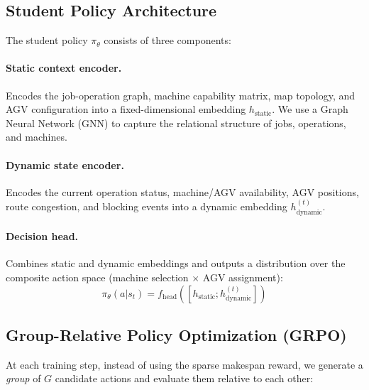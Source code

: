 \documentclass[11pt,a4paper]{article}
\begin{document}
\subsection{Student Policy Architecture}

The student policy $\pi_\theta$ consists of three components:

\paragraph{Static context encoder.}
Encodes the job-operation graph, machine capability matrix, map topology, and AGV configuration into a fixed-dimensional embedding $h_{\text{static}}$. We use a Graph Neural Network (GNN) to capture the relational structure of jobs, operations, and machines.

\paragraph{Dynamic state encoder.}
Encodes the current operation status, machine/AGV availability, AGV positions, route congestion, and blocking events into a dynamic embedding $h_{\text{dynamic}}^{(t)}$.

\paragraph{Decision head.}
Combines static and dynamic embeddings and outputs a distribution over the composite action space (machine selection $\times$ AGV assignment):
\begin{equation}
    \pi_\theta(a | s_t) = f_{\text{head}}\left(\left[h_{\text{static}}; h_{\text{dynamic}}^{(t)}\right]\right)
\end{equation}

\subsection{Group-Relative Policy Optimization (GRPO)}

At each training step, instead of using the sparse makespan reward, we generate a \emph{group} of $G$ candidate actions and evaluate them relative to each other:
\end{document}
